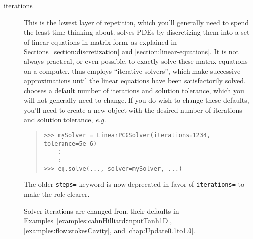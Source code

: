     \begin{description}
    
        \item[iterations] This is the lowest layer of repetition,
        which you'll generally need to spend the least time thinking
        about. \FiPy{} solves PDEs by discretizing them into a set of
        linear equations in matrix form, as explained in
        Sections~\ref{section:discretization} and
        \ref{section:linear-equations}. It is not always practical, or
        even possible, to exactly solve these matrix equations on a
        computer. \FiPy{} thus employs ``iterative solvers'', which
        make successive approximations until the linear equations have
        been satisfactorily solved. \FiPy{} chooses a default number
        of iterations and solution tolerance, which you will not
        generally need to change. If you do wish to change these
        defaults, you'll need to create a new  object
        with the desired number of iterations and solution tolerance,
        \emph{e.g.}
        \begin{quote}
\begin{verbatim}
>>> mySolver = LinearPCGSolver(iterations=1234, tolerance=5e-6) 
    : 
    :
>>> eq.solve(..., solver=mySolver, ...)
\end{verbatim}
    	\end{quote}
        \begin{reSTadmonition}[Note]
        The older  \verb+steps=+ keyword is now
        deprecated in favor of \verb+iterations=+ to make the role
        clearer.
        \end{reSTadmonition}
        Solver iterations are changed from their defaults in
        Examples~\ref{examples:cahnHilliard:inputTanh1D},
        \ref{examples:flow:stokesCavity}, and
        \ref{chap:Update0.1to1.0}.
        

\end{description}
